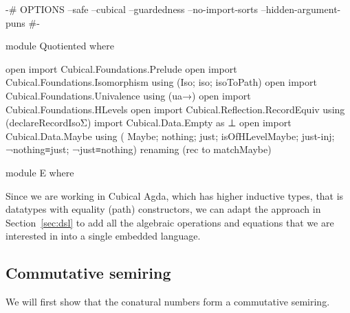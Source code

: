 \begin{code}[hide]
{-# OPTIONS
  --safe
  --cubical
  --guardedness
  --no-import-sorts
  --hidden-argument-puns #-}

module Quotiented where

open import Cubical.Foundations.Prelude
open import Cubical.Foundations.Isomorphism using (Iso; iso; isoToPath)
open import Cubical.Foundations.Univalence using (ua→)
open import Cubical.Foundations.HLevels
open import Cubical.Reflection.RecordEquiv using (declareRecordIsoΣ)
import Cubical.Data.Empty as ⊥
open import Cubical.Data.Maybe
  using
    ( Maybe; nothing; just;
      isOfHLevelMaybe; just-inj; ¬nothing≡just; ¬just≡nothing)
  renaming (rec to matchMaybe)

module E where
\end{code}
Since we are working in Cubical Agda, which has higher inductive types, that is
datatypes with equality (path) constructors, we can adapt the approach in
Section~\ref{sec:dsl} to add all the algebraic operations and equations that we
are interested in into a single embedded language.

\subsection{Commutative semiring}

We will first show that the conatural numbers form a commutative semiring.


